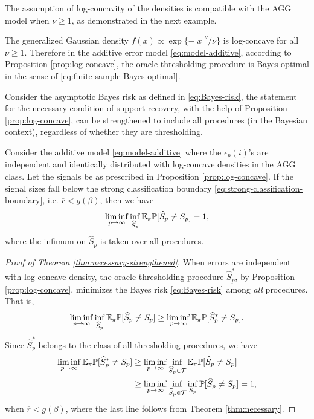 The assumption of log-concavity of the densities is compatible with the AGG model when $\nu\ge1$, as demonstrated in the next example.

\begin{example} \label{exmp:AGG-logconcave}
The generalized Gaussian density $f(x)\propto \exp\{-|x|^\nu/\nu\}$ is log-concave for all $\nu\ge1$.
Therefore in the additive error model \eqref{eq:model-additive}, according to Proposition \ref{prop:log-concave}, the oracle thresholding procedure is Bayes optimal in the sense of \eqref{eq:finite-sample-Bayes-optimal}.
\end{example}


Consider the asymptotic Bayes risk as defined in \eqref{eq:Bayes-risk}, the statement for the necessary condition of support recovery, with the help of Proposition \ref{prop:log-concave}, can be strengthened to include all procedures (in the Bayesian context), regardless of whether they are thresholding.

\begin{theorem} \label{thm:necessary-strengthened}
Consider the additive model \eqref{eq:model-additive} where the $\epsilon_p(i)$'s are independent and identically distributed with log-concave densities in the AGG class. 
Let the signals be as prescribed in Proposition \ref{prop:log-concave}.
If the signal sizes fall below the strong classification boundary \eqref{eq:strong-classification-boundary}, i.e. $\overline{r}<g(\beta)$,
then we have
\begin{equation} \label{eq:classification-impossible-Bayes}
    \liminf_{p\to\infty} \inf_{\widehat{S}_p} {\mathbb E}_\pi {\mathbb P}[\widehat{S}_p\neq S_p] = 1,
\end{equation}
where the infimum on $\widehat{S}_p$ is taken over all procedures.
\end{theorem}

\begin{proof}[Proof of Theorem \ref{thm:necessary-strengthened}]
When errors are independent with log-concave density, the oracle thresholding procedure $\widehat{S}^*_p$, by Proposition \ref{prop:log-concave}, minimizes the Bayes risk \eqref{eq:Bayes-risk} among \emph{all} procedures. That is,
$$
\liminf_{p\to\infty} \inf_{\widehat{S}_p} {\mathbb E}_\pi{\mathbb P}[\widehat{S}_p\neq S_p]
\ge \liminf_{p\to\infty} {\mathbb E}_\pi{\mathbb P}[\widehat{S}^*_p\neq S_p].
$$
Since $\widehat{S}^*_p$ belongs to the class of all thresholding procedures, we have
\begin{align*}
    \liminf_{p\to\infty} {\mathbb E}_\pi{\mathbb P}[\widehat{S}^*_p\neq S_p] 
    &\ge \liminf_{p\to\infty} \inf_{\widehat{S}_p\in{\cal T}} {\mathbb E}_\pi{\mathbb P}[\widehat{S}_p\neq S_p] \\
    &\ge \liminf_{p\to\infty} \inf_{\widehat{S}_p\in{\cal T}} \inf_{S_p} {\mathbb P}[\widehat{S}_p\neq S_p] = 1,
\end{align*}
when $\overline{r}<g(\beta)$, where the last line follows from Theorem \ref{thm:necessary}.
\end{proof}

